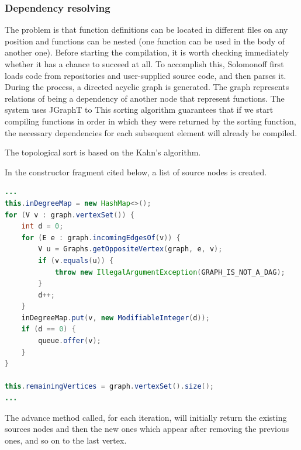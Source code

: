 \hypertarget{dependency-resolving}{%
\subsubsection{Dependency resolving}\label{dependency-resolving}}

The problem is that function definitions can be located in different
files on any position and functions can be nested (one function can be
used in the body of another one). Before starting the compilation, it is
worth checking immediately whether it has a chance to succeed at all. To
accomplish this, Solomonoff first loads code from repositories and
user-supplied source code, and then parses it. During the process,
a directed acyclic graph is
generated. The graph represents relations of being a dependency of
another node that represent functions. The system uses JGraphT to
This sorting algorithm guarantees that if we start compiling functions
in order in which they were returned by the sorting function,
the necessary dependencies for each subsequent element will already
be compiled.

The topological sort is based on the Kahn's algorithm.

In the constructor fragment cited below, a list of source nodes is
created.

\begin{lstlisting}[language=Java, frame=single]
...
this.inDegreeMap = new HashMap<>();
for (V v : graph.vertexSet()) {
    int d = 0;
    for (E e : graph.incomingEdgesOf(v)) {
        V u = Graphs.getOppositeVertex(graph, e, v);
        if (v.equals(u)) {
            throw new IllegalArgumentException(GRAPH_IS_NOT_A_DAG);
        }
        d++;
    }
    inDegreeMap.put(v, new ModifiableInteger(d));
    if (d == 0) {
        queue.offer(v);
    }
}

this.remainingVertices = graph.vertexSet().size();
...
\end{lstlisting}

The advance method called, for each iteration, will initially return the
existing sources nodes and then the new ones which appear after
removing the previous ones, and so on to the last vertex.

